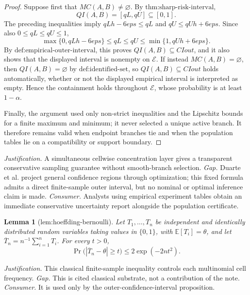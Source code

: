 \documentclass{article}
\newtheorem{lemma}{Lemma}
\begin{document}
\begin{proof}
Suppose first that \(MC(A,B)\ne\varnothing\).  By \(\text{thm:sharp-risk-interval}\),
\[
 QI(A,B)=[qL,qU]\subseteq[0,1].
\]
The preceding inequalities imply \(qLh-6eps\le qL\) and \(qU\le qUh+6eps\).  Since also \(0\le qL\le qU\le1\),
\[
 \max\{0,qLh-6eps\}
 \le qL
 \le qU
 \le \min\{1,qUh+6eps\}.
\]
By \(\text{def:empirical-outer-interval}\), this proves \(QI(A,B)\subseteq CIout\), and it also shows that the displayed interval is nonempty on \(\mathcal E\).  If instead \(MC(A,B)=\varnothing\), then \(QI(A,B)=\varnothing\) by \(\text{def:identified-set}\), so \(QI(A,B)\subseteq CIout\) holds automatically, whether or not the displayed empirical interval is interpreted as empty.  Hence the containment holds throughout \(\mathcal E\), whose probability is at least \(1-\alpha\).

Finally, the argument used only non-strict inequalities and the Lipschitz bounds for a finite maximum and minimum; it never selected a unique active branch.  It therefore remains valid when endpoint branches tie and when the population tables lie on a compatibility or support boundary.
\end{proof}
\par\smallskip\noindent \textit{Justification.} A simultaneous cellwise concentration layer gives a transparent conservative sampling guarantee without smooth-branch selection. \textit{Gap.} Duarte et al. project general confidence regions through optimization; this fixed formula admits a direct finite-sample outer interval, but no nominal or optimal inference claim is made. \textit{Consumer.} Analysts using empirical experiment tables obtain an immediate conservative uncertainty report alongside the population certificate.

\begin{lemma}[lem:hoeffding-bernoulli]\label{lem:hoeffding-bernoulli}
Let \(T_1,\ldots,T_n\) be independent and identically distributed random variables taking values in \(\{0,1\}\), with \(\mathbb E[T_i]=\theta\), and let \(\overline T_n=n^{-1}\sum_{i=1}^nT_i\).  For every \(t>0\),
\[
\Pr\bigl(|\overline T_n-\theta|\ge t\bigr)\le 2\exp(-2nt^2).
\]
\end{lemma}
\par\smallskip\noindent \textit{Justification.} This classical finite-sample inequality controls each multinomial cell frequency. \textit{Gap.} This is cited classical substrate, not a contribution of the note. \textit{Consumer.} It is used only by the outer-confidence-interval proposition.
\end{document}
